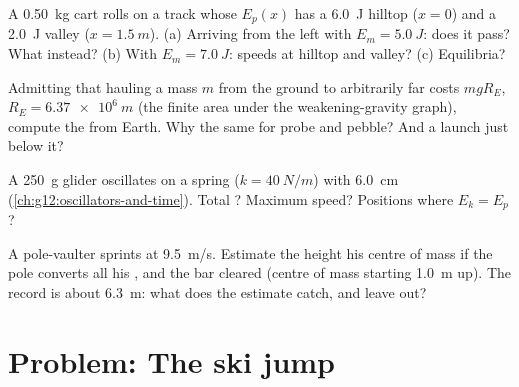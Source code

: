 \begin{exercise}[$\star\star\star$]\label{exo:g12:work-and-energy:12}
A \qty{0.50}{kg} cart rolls on a track whose $E_p(x)$ has a
\qty{6.0}{J} hilltop ($x = 0$) and a \qty{2.0}{J} valley
($x = \qty{1.5}{m}$). (a) Arriving from the left with
$E_m = \qty{5.0}{J}$: does it pass? What instead? (b) With
$E_m = \qty{7.0}{J}$: speeds at hilltop and valley? (c) Equilibria?
\end{exercise}

\begin{exercise}[$\star\star\star$]\label{exo:g12:work-and-energy:13}
Admitting that hauling a mass $m$ from the ground to arbitrarily far
costs $mgR_E$, $R_E = \qty{6.37e6}{m}$ (the finite area under the
weakening-gravity graph), compute the \emph{} from Earth.
Why the same for probe and pebble? And a launch just below it?
\end{exercise}

\begin{exercise}[$\star\star\star$]\label{exo:g12:work-and-energy:14}
A \qty{250}{g} glider oscillates on a spring ($k = \qty{40}{N/m}$)
with  \qty{6.0}{cm} (\cref{ch:g12:oscillators-and-time}).
Total ? Maximum speed? Positions where $E_k = E_p$?
\end{exercise}

\begin{exercise}[$\star\star\star$]\label{exo:g12:work-and-energy:15}
A pole-vaulter sprints at \qty{9.5}{m/s}. Estimate the height his
centre of mass  if the pole converts all his , and
the bar cleared (centre of mass starting \qty{1.0}{m} up). The record
is about \qty{6.3}{m}: what does the estimate catch, and leave out?
\end{exercise}

\section{Problem: The ski jump}

